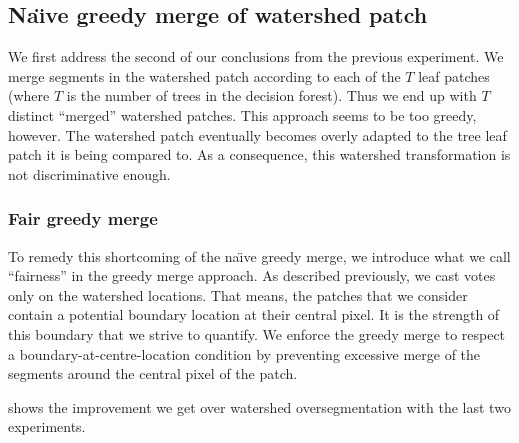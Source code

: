 \subsection*{Na\"{\i}ve greedy merge of watershed patch}
We first address the second of our conclusions from the previous experiment. We merge segments in the watershed patch according to each of the $T$ leaf patches (where $T$ is the number of trees in the decision forest). Thus we end up with $T$ distinct ``merged'' watershed patches. This approach seems to be too greedy, however. The watershed patch eventually becomes overly adapted to the tree leaf patch it is being compared to. As a consequence, this watershed transformation is not discriminative enough.

\subsubsection*{Fair greedy merge}
To remedy this shortcoming of the na\"{\i}ve greedy merge, we introduce what we call ``fairness'' in the greedy merge approach. As described previously, we cast votes only on the watershed locations. That means, the patches that we consider contain a potential boundary location at their central pixel. It is the strength of this boundary that we strive to quantify. We enforce the greedy merge to respect a boundary-at-centre-location condition by preventing excessive merge of the segments around the central pixel of the patch.

 shows the improvement we get over watershed oversegmentation with the last two experiments.

